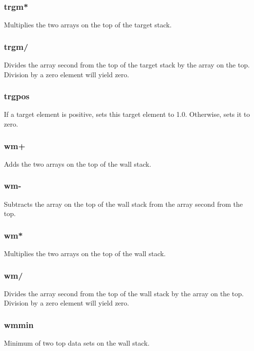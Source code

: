 \documentclass[a4paper,10pt]{report}
\begin{document}
\subsubsection{trgm*}\label{sec:trgm*}
Multiplies the two arrays on the top of the target stack.

\subsubsection{trgm/}\label{sec:trgm/}
Divides the array second from the top of the target stack by the array on the top.
Division by a zero element will yield zero.

\subsubsection{trgpos}\label{sec:trgpos}
If a target element is positive, sets this target element to 1.0.
Otherwise, sets it to zero.

\subsubsection{wm+}\label{sec:wm+}
Adds the two arrays on the top of the wall stack.

\subsubsection{wm-}\label{sec:wm-}
Subtracts the array on the top of the wall stack from the array second from
the top.

\subsubsection{wm*}\label{sec:wm*}
Multiplies the two arrays on the top of the wall stack.

\subsubsection{wm/}\label{sec:wm/}
Divides the array second from the top of the wall stack by the array on
the top. Division by a zero element will yield zero.

\subsubsection{wmmin}\label{sec:wmmin}
Minimum of two top data sets on the wall stack.
\end{document}
